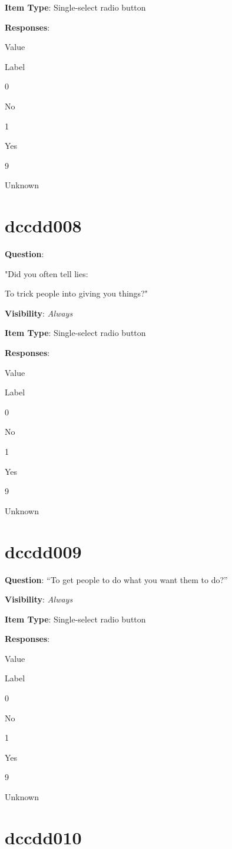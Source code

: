\documentclass[]{book}
\begin{document}
\textbf{Item Type}: Single-select radio button

\textbf{Responses}:

Value

Label

0

No

1

Yes

9

Unknown

\hypertarget{dccdd008}{%
\section{dccdd008}\label{dccdd008}}

\textbf{Question}:

"Did you often tell lies:

To trick people into giving you things?"

\textbf{Visibility}: \emph{Always}

\textbf{Item Type}: Single-select radio button

\textbf{Responses}:

Value

Label

0

No

1

Yes

9

Unknown

\hypertarget{dccdd009}{%
\section{dccdd009}\label{dccdd009}}

\textbf{Question}: ``To get people to do what you want them to do?''

\textbf{Visibility}: \emph{Always}

\textbf{Item Type}: Single-select radio button

\textbf{Responses}:

Value

Label

0

No

1

Yes

9

Unknown

\hypertarget{dccdd010}{%
\section{dccdd010}\label{dccdd010}}
\end{document}
